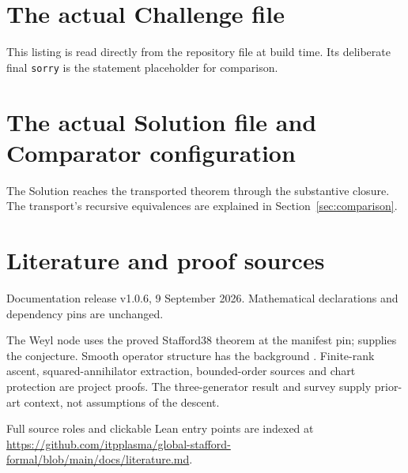 \documentclass[11pt,a4paper]{article}
\newcommand{\code}[1]{\nolinkurl{#1}}
\begin{document}
\appendix
\clearpage
\section{The actual Challenge file}\label{sec:challenge}
This listing is read directly from the repository file at build time.
Its deliberate final \code{sorry} is the statement placeholder for comparison.

\clearpage
\section{The actual Solution file and Comparator configuration}\label{sec:solution}
The Solution reaches the transported theorem through the substantive closure.
The transport's recursive equivalences are explained in
Section~\ref{sec:comparison}.

\section{Literature and proof sources}\label{sec:literature}
Documentation release v1.0.6, 9 September 2026. Mathematical declarations and dependency pins are unchanged.

The Weyl node uses the proved Stafford38 theorem at the manifest pin;
\cite{Sta78} supplies the conjecture. Smooth operator structure has the
background \cite{StacksD,StacksS,Bav10}. Finite-rank ascent, squared-annihilator
extraction, bounded-order sources and chart protection are project proofs.
The three-generator result \cite{CH88} and survey \cite{Bel26} supply prior-art
context, not assumptions of the descent.

Full source roles and clickable Lean entry points are indexed at \url{https://github.com/itpplasma/global-stafford-formal/blob/main/docs/literature.md}.
\end{document}
